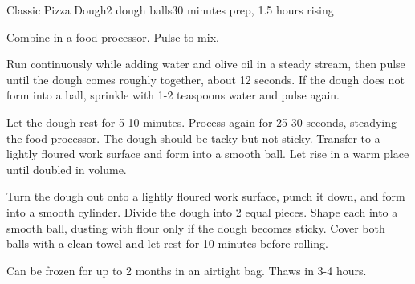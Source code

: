 \documentclass[../Cookbook.tex]{subfiles}
\begin{document}
\begin{recipe}{Classic Pizza Dough}{2 dough balls}{30 minutes prep, 1.5 hours rising}

Combine in a food processor. Pulse to mix.

Run continuously while adding water and olive oil in a steady stream, then pulse until the dough comes roughly together, about 12 seconds. If the dough does not form into a ball, sprinkle with 1-2 teaspoons water and pulse again.

\newstep
Let the dough rest for 5-10 minutes. Process again for 25-30 seconds, steadying the food processor. The dough should be tacky but not sticky. Transfer to a lightly floured work surface and form into a smooth ball. Let rise in a warm place until doubled in volume.

\newstep
Turn the dough out onto a lightly floured work surface, punch it down, and form into a smooth cylinder. Divide the dough into 2 equal pieces. Shape each into a smooth ball, dusting with flour only if the dough becomes sticky. Cover both balls with a clean towel and let rest for 10 minutes before rolling.



Can be frozen for up to 2 months in an airtight bag. Thaws in 3-4 hours.

\end{recipe}
\end{document}
